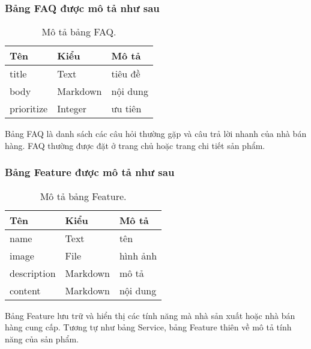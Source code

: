 \subsubsection{Bảng FAQ được mô tả như sau}
\begin{table}[!htbp]\fontsize{13px}{13px}\selectfont\justifying
\begin{center}
\caption{Mô tả bảng FAQ.}
\begin{tabularx}{0.6\textwidth}{ |l|l|X| } 
\hline
Tên & Kiểu & Mô tả \\
\hline
title & Text & tiêu đề \\
body & Markdown & nội dung \\
prioritize & Integer & ưu tiên \\ 
\hline
\end{tabularx}
\label{table:FAQ}
\end{center}
Bảng FAQ là danh sách các câu hỏi thường gặp và câu trả lời nhanh của nhà bán hàng. FAQ thường được đặt ở trang chủ hoặc trang chi tiết sản phẩm.
\end{table}

\subsubsection{Bảng Feature được mô tả như sau}
\begin{table}[!htbp]\fontsize{13px}{13px}\selectfont\justifying
\begin{center}
\caption{Mô tả bảng Feature.}
\begin{tabularx}{0.6\textwidth}{ |l|l|X| } 
\hline
Tên & Kiểu & Mô tả \\
\hline
name & Text & tên \\
image & File & hình ảnh \\
description & Markdown & mô tả \\
content & Markdown & nội dung \\ 
\hline
\end{tabularx}
\label{table:Feature}
\end{center}
Bảng Feature lưu trữ và hiển thị các tính năng mà nhà sản xuất hoặc nhà bán hàng cung cấp. Tương tự như bảng Service, bảng Feature thiên về mô tả tính năng của sản phẩm.
\end{table}

